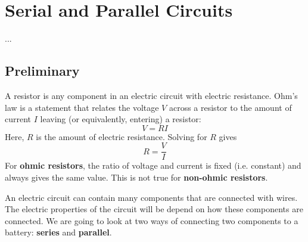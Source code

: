 \setcounter{chapter}{2}
\chapter{Serial and Parallel Circuits}
...
\section{Preliminary}
A resistor is any component in an electric circuit with electric resistance. Ohm's law is a statement that relates the voltage $V$ across a resistor to the amount of current $I$ leaving (or equivalently, entering) a resistor:
\begin{equation}
	V = R I
\end{equation}
Here, $R$ is the amount of electric resistance. Solving for $R$ gives
\begin{equation} \label{eq.03.ROhmLaw}
	R = \frac{V}{I}
\end{equation}
For \textbf{ohmic resistors}, the ratio of voltage and current is fixed (i.e. constant) and always gives the same value. This is not true for \textbf{non-ohmic resistors}.

An electric circuit can contain many components that are connected with wires. The electric properties of the circuit will be depend on how these components are connected. We are going to look at two ways of connecting two components to a battery: \textbf{series} and \textbf{parallel}.
